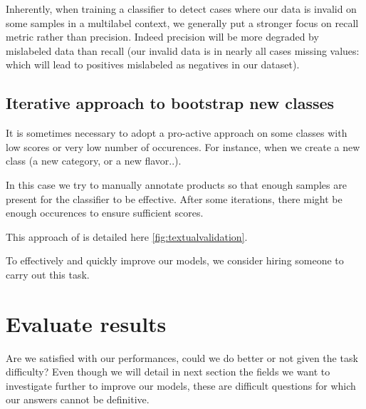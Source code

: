 Inherently, when training a classifier to detect cases where our data is invalid on some samples in a multilabel context, we generally put a stronger focus on recall metric rather than precision. Indeed precision will be more degraded by mislabeled data than recall (our invalid data is in nearly all cases missing values: which will lead to positives mislabeled as negatives in our dataset).

\subsection{Iterative approach to bootstrap new classes}

It is sometimes necessary to adopt a pro-active approach on some classes with low scores or very low number of occurences. 
For instance, when we create a new class (a new category, or a new flavor..).

In this case we try to manually annotate products so that enough samples are present for the classifier to be effective. After some iterations, there might be enough occurences to ensure sufficient scores.

This approach of is detailed here \ref{fig:textualvalidation}.

To effectively and quickly improve our models, we consider hiring someone to carry out this task. 

\section{Evaluate results}

Are we satisfied with our performances, could we do better or not given the task difficulty? Even though we will detail in next section the fields we want to investigate further to improve our models, these are difficult questions for which our answers cannot be definitive.

